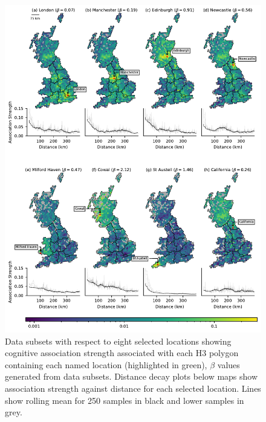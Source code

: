 \documentclass[
  letterpaper,
  11pt,
  english,
  onehalfspacing,
  headsepline]{MastersDoctoralThesis}
\begin{document}
\begin{figure}

{\centering \includegraphics{04_connections/04_figures/fig-polys-output-1.pdf}

}

\caption{\label{fig-polys}Data subsets with respect to eight selected
locations showing cognitive association strength associated with each H3
polygon containing each named location (highlighted in green), \(\beta\)
values generated from data subsets. Distance decay plots below maps show
association strength against distance for each selected location. Lines
show rolling mean for 250 samples in black and lower samples in grey.}

\end{figure}
\end{document}
